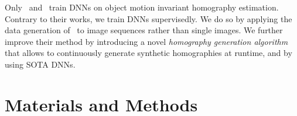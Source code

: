 Only~\cite{le2020deep} and~\cite{zhang2020content} train DNNs on object motion invariant homography estimation. Contrary to their works, we train DNNs supervisedly. We do so by applying the data generation of~\cite{detone2016deep} to image sequences rather than single images. We further improve their method by introducing a novel \textit{homography generation algorithm} that allows to continuously generate synthetic homographies at runtime, and by using SOTA DNNs.

\section{Materials and Methods}

